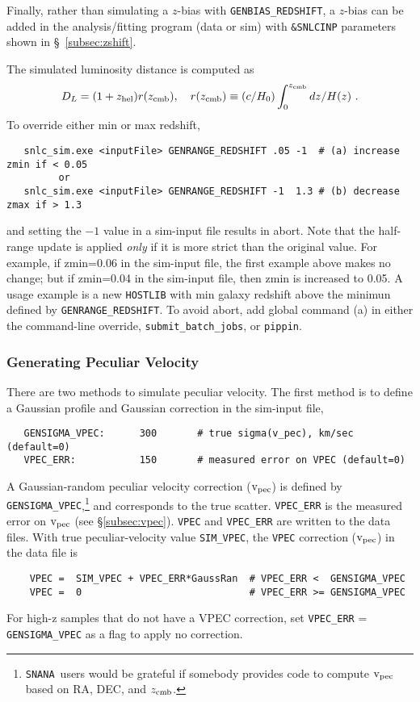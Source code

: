 \documentclass[12pt]{article}
\newcommand{\snana}{{\tt SNANA}}
\newcommand{\zhelio}{z_{\rm hel}}
\newcommand{\zcmb}{z_{\rm cmb}}
\newcommand{\vpec}{{\rm v}_{\rm pec}}
\begin{document}
Finally, rather than simulating a $z$-bias with {\tt GENBIAS\_REDSHIFT},
a $z$-bias can be added in the analysis/fitting program 
(data or sim) with 
{\tt \&SNLCINP} parameters shown in \S~\ref{subsec:zshift}.

\medskip
The simulated luminosity distance is computed as 
\begin{equation}
  D_L = (1+\zhelio)r(\zcmb),~~~ 
     r(\zcmb) \equiv (c/H_0)\int_0^{\zcmb} dz/H(z)~.
\end{equation}
%
\medskip
To override either min or max redshift,
\vspace{-0.4cm}
\begin{verbatim}
   snlc_sim.exe <inputFile> GENRANGE_REDSHIFT .05 -1  # (a) increase zmin if < 0.05
         or
   snlc_sim.exe <inputFile> GENRANGE_REDSHIFT -1  1.3 # (b) decrease zmax if > 1.3
\end{verbatim}
\vspace{-0.2cm}
and setting the $-1$ value in a sim-input file results in abort.
Note that the half-range update is applied {\it only} if it is more strict
than the original value.
For example, if zmin=0.06 in the sim-input file, 
the first example above makes no change; 
but if zmin=0.04 in the sim-input file, then zmin is increased to 0.05.
A usage example is a new {\tt HOSTLIB} with min galaxy redshift above
the minimun defined by {\tt GENRANGE\_REDSHIFT}.
To avoid abort, add global command (a) in either the
command-line override, {\tt submit\_batch\_jobs}, or {\tt pippin}.

\clearpage 
\subsubsection{Generating Peculiar Velocity}
\label{sss:vpec}

There are two methods to simulate peculiar velocity.
The first method is to define a Gaussian profile and Gaussian 
correction in the sim-input file,
\begin{verbatim}
   GENSIGMA_VPEC:      300       # true sigma(v_pec), km/sec  (default=0)
   VPEC_ERR:           150       # measured error on VPEC (default=0)
\end{verbatim}

A Gaussian-random peculiar velocity correction ($\vpec$) is defined by 
{\tt GENSIGMA\_VPEC},\footnote{\snana\ users would be grateful
  if somebody provides code to compute $\vpec$ based on
  RA, DEC, and $\zcmb$.}
and corresponds to the true scatter.
{\tt VPEC\_ERR} is the measured error on $\vpec$
(see \S\ref{subsec:vpec}).
{\tt VPEC} and {\tt VPEC\_ERR} are written to the data files.
With true peculiar-velocity value {\tt SIM\_VPEC}, 
the {\tt VPEC} correction ($\vpec$) in the data file is
\begin{verbatim}
    VPEC =  SIM_VPEC + VPEC_ERR*GaussRan  # VPEC_ERR <  GENSIGMA_VPEC
    VPEC =  0                             # VPEC_ERR >= GENSIGMA_VPEC
\end{verbatim}
%
For high-z samples that do not have a VPEC correction,
set {\tt VPEC\_ERR} = {\tt GENSIGMA\_VPEC} as a flag to
apply no correction.
\end{document}
